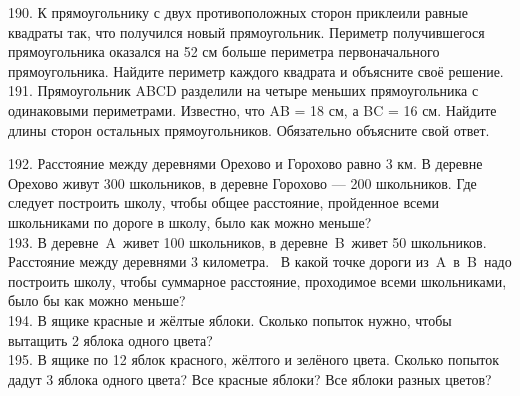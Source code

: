 \documentclass[12pt]{article}
\begin{document}
190.  К прямоугольнику с двух противоположных сторон приклеили равные квадраты так, что получился новый прямоугольник. Периметр получившегося прямоугольника оказался на 52 см больше периметра первоначального прямоугольника. Найдите периметр каждого квадрата и объясните своё решение.\\
191. Прямоугольник ABCD разделили на четыре меньших прямоугольника с одинаковыми периметрами. Известно, что AB = 18 см, а BC = 16 см. Найдите длины сторон остальных прямоугольников. Обязательно объясните свой ответ.
\begin{center}
\begin{figure}[ht!]
\end{figure}
\end{center}
192. Расстояние между деревнями Орехово и Горохово равно 3 км. В деревне Орехово живут 300 школьников, в деревне Горохово --- 200 школьников. Где следует построить школу, чтобы общее расстояние, пройденное всеми школьниками по дороге в школу, было как можно меньше?\\
193. В деревне A живет 100 школьников, в деревне B живет 50 школьников. Расстояние между деревнями 3 километра. 
В какой точке дороги из A в B надо построить школу, чтобы суммарное расстояние, проходимое всеми школьниками, было бы как можно меньше?\\
194. В ящике красные и жёлтые яблоки. Сколько попыток нужно, чтобы вытащить 2 яблока одного цвета?\\
195. В ящике по 12 яблок красного, жёлтого и зелёного цвета. Сколько попыток дадут 3 яблока одного цвета? Все красные яблоки? Все яблоки разных цветов?\\
\end{document}
